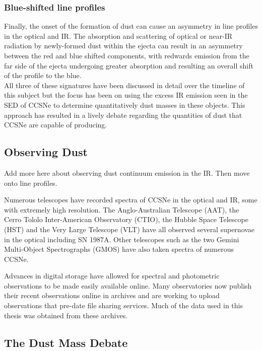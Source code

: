 \subsubsection{Blue-shifted line profiles}
Finally, the onset of the formation of dust can cause an asymmetry in line profiles in the optical and IR.  The absorption and scattering of optical or near-IR radiation by newly-formed dust within the ejecta can result in an asymmetry between the red and blue shifted components, with redwards 
emission from the far side of the ejecta undergoing greater absorption and resulting an overall shift of the profile to the blue.
\\

\noindent All three of these signatures have been discussed in detail over the timeline of this subject but the focus has been on using the excess IR emission seen in the SED of CCSNe to determine quantitatively dust masses in these objects.  This approach has resulted in a lively debate regarding the quantities of dust that CCSNe are capable of producing.
 
 \subsection{Observing Dust}

Add more here about observing dust continuum emission in the IR.  Then move onto line profiles.

Numerous telescopes have recorded spectra of CCSNe in the optical and IR, some with extremely high resolution.  The Anglo-Australian Telescope (AAT), the Cerro Tololo Inter-American Observatory (CTIO), the Hubble Space Telescope (HST) and the Very Large Telescope (VLT) have all observed several supernovae in the optical including SN 1987A.  Other telescopes such as  the two Gemini Multi-Object Spectrographs (GMOS) have also taken spectra of numerous CCSNe.

Advances in digital storage have allowed for spectral and photometric observations to be made easily available online.  Many observatories now publish their recent observations online in archives and are working to upload observations that pre-date file sharing services.  Much of the data used in this thesis was obtained from these archives.


\subsection{The Dust Mass Debate}

